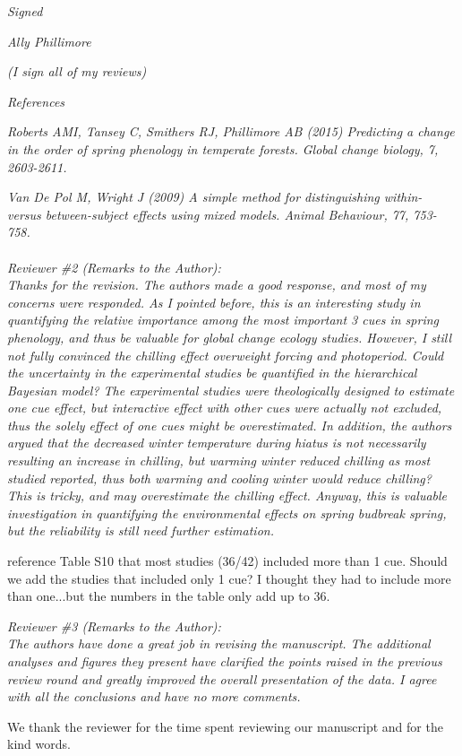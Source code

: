 \documentclass[11pt, a4paper]{article}
\begin{document}
\par \emph{Signed}
\par \emph{Ally Phillimore}
\par \emph{(I sign all of my reviews)}
\par \emph{References}
\par \emph{Roberts AMI, Tansey C, Smithers RJ, Phillimore AB (2015) Predicting a change in the order of spring
phenology in temperate forests. Global change biology, 7, 2603-2611.}
\par \emph{Van De Pol M, Wright J (2009) A simple method for distinguishing within- versus between-subject effects
using mixed models. Animal Behaviour, 77, 753-758.}
\\
\\
 \emph{Reviewer \#2 (Remarks to the Author):}\\

\emph{Thanks for the revision. The authors made a good response, and most of my concerns were responded. As I pointed before, this is an interesting study in quantifying the relative importance among the most important 3 cues in spring phenology, and thus be valuable for global change ecology studies. However, I still not fully convinced the chilling effect overweight forcing and photoperiod. Could the uncertainty in the experimental studies be quantified in the hierarchical Bayesian model? The experimental studies were theologically designed to estimate one cue effect, but interactive effect with other cues were actually not excluded, thus the solely effect of one cues might be overestimated. In addition, the authors argued that the decreased winter temperature during hiatus is not necessarily resulting an increase in chilling, but warming winter reduced chilling as most studied reported, thus both warming and cooling winter would reduce chilling? This is tricky, and may overestimate
the chilling effect. Anyway, this is valuable investigation in quantifying the environmental effects on spring budbreak spring, but the reliability is still need further estimation.
}\\

\par reference Table  S10 that most studies (36/42)  included more than 1 cue. Should we add the studies that included only 1 cue? I thought they had to include more than one...but the numbers in the table only add up to 36.

 \emph{Reviewer \#3 (Remarks to the Author):}\\

\emph{The authors have done a great job in revising the manuscript. The additional analyses and figures they present have clarified the points raised in the previous review round and greatly improved the overall presentation of the data. I agree with all the conclusions and have no more comments.}

\par We thank the reviewer for the time spent reviewing our manuscript and for the kind words. 

\end{document}
